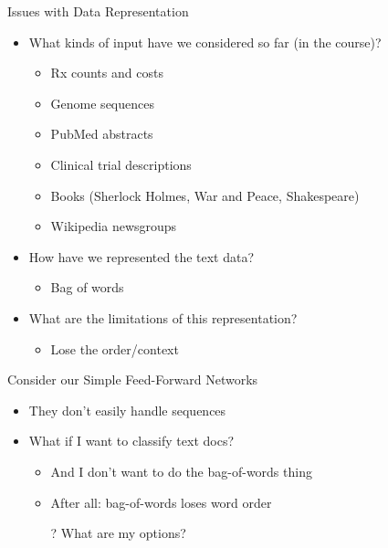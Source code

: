 \documentclass[aspectratio=169]{beamer}
\begin{document}
\begin{frame}{Issues with Data Representation}

\begin{itemize}
	\item What kinds of input have we considered so far (in the course)?
	\begin{itemize}
	\item Rx counts and costs
	\item Genome sequences
	\item PubMed abstracts
	\item Clinical trial descriptions
	\item Books (Sherlock Holmes, War and Peace, Shakespeare)
	\item Wikipedia newsgroups
	\end{itemize}
	\item How have we represented the text data?
	\begin{itemize}
		\item Bag of words
	\end{itemize}
	\item What are the limitations of this representation?
	\begin{itemize}
		\item Lose the order/context
	\end{itemize}
\end{itemize}
\end{frame}
\begin{frame}{Consider our Simple Feed-Forward Networks}

\begin{itemize}
	\item They don't easily handle sequences
	\item What if I want to classify text docs?
	\begin{itemize}
	\item And I don't want to do the bag-of-words thing
	\item After all: bag-of-words loses word order
	\item[?] What are my options?
	\end{itemize}
\end{itemize}
\end{frame}
\end{document}

